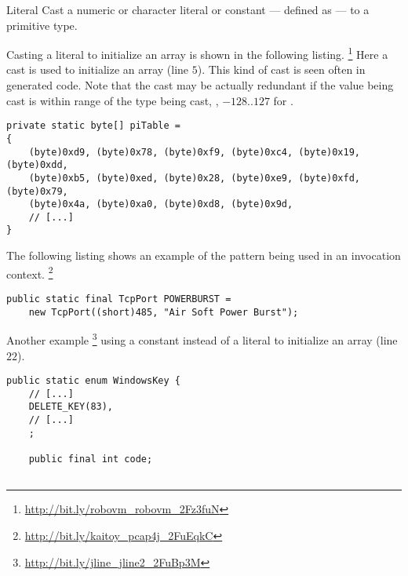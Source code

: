 \begin{pattern}{Literal}
%
%
Cast a numeric or character literal or constant --- defined as  ---
to a primitive type.

\instances{}
Casting a literal to initialize an array is shown in the following listing.%
\footnote{\url{http://bit.ly/robovm_robovm_2Fz3fuN}}
Here a cast is used to initialize an array (line $5$).
This kind of cast is seen often in generated code.
Note that the cast may be actually redundant if the value being cast
is within range of the type being cast,
\eg{}, $-128..127$ for .

\begin{verbatim}
private static byte[] piTable =
{
    (byte)0xd9, (byte)0x78, (byte)0xf9, (byte)0xc4, (byte)0x19, (byte)0xdd,
    (byte)0xb5, (byte)0xed, (byte)0x28, (byte)0xe9, (byte)0xfd, (byte)0x79,
    (byte)0x4a, (byte)0xa0, (byte)0xd8, (byte)0x9d, 
    // [...]
}
\end{verbatim}

The following listing shows an example of the \thisp{} pattern
being used in an invocation context.%
\footnote{\url{http://bit.ly/kaitoy_pcap4j_2FuEqkC}}

\begin{verbatim}
public static final TcpPort POWERBURST =
    new TcpPort((short)485, "Air Soft Power Burst");
\end{verbatim}

Another example%
\footnote{\url{http://bit.ly/jline_jline2_2FuBp3M}}
using a constant instead of a literal to initialize
an array (line $22$).

\begin{verbatim}
public static enum WindowsKey {
    // [...]
    DELETE_KEY(83), 
    // [...]
    ;

    public final int code;


\end{verbatim}
\end{pattern}
